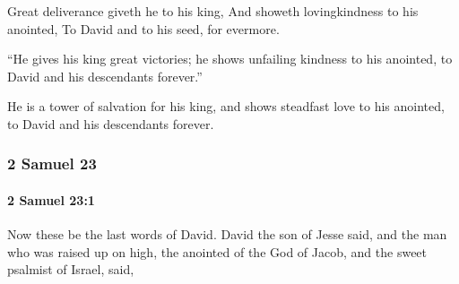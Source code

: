 			\begin{versebox}
					\item[BHS] 
					\item[ASV] Great deliverance giveth he to his king, And showeth lovingkindness to his anointed, To David and to his seed, for evermore.
					\item[NIV] “He gives his king great victories; he shows unfailing kindness to his anointed, to David and his descendants forever.”
					\item[NRSV] He is a tower of salvation for his king, and shows steadfast love to his anointed, to David and his descendants forever.
			\end{versebox}
	\subsubsection{2 Samuel 23} %
		\label{2SAMUEL-23}

		\paragraph{2 Samuel 23:1} %
			\label{2SAMUEL-23-1}

			Now these be the last words of David. David the son of Jesse said, and the man who was raised up on high, the anointed of the God of Jacob, and the sweet psalmist of Israel, said,

